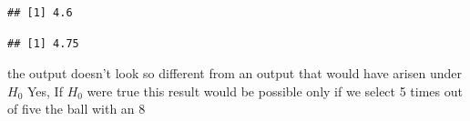 \begin{ExerciseList}
	\Answer
\begin{knitrout}
\color{fgcolor}\begin{kframe}
\begin{alltt}
 \hlkwb{<-} \hldef{(}\hldef{,}\hldef{,}\hldef{,}\hldef{,}\hldef{)}
\end{alltt}
\begin{verbatim}
## [1] 4.6
\end{verbatim}
\end{kframe}
\end{knitrout}
\begin{knitrout}
\color{fgcolor}\begin{kframe}
\begin{alltt}
 \hlkwb{<-} \hldef{(}\hldef{,}\hldef{,}\hldef{,}\hldef{,}\hldef{,}\hldef{,}\hldef{,}\hldef{)}
\end{alltt}
\begin{verbatim}
## [1] 4.75
\end{verbatim}
\end{kframe}
\end{knitrout}

the output doesn't look so different from an output that would have arisen under $H_0$ 
	\Answer
	Yes, If $H_0$ were true this result would be possible only if we select 5 times out of five the ball with an 8  
	

\end{ExerciseList}
